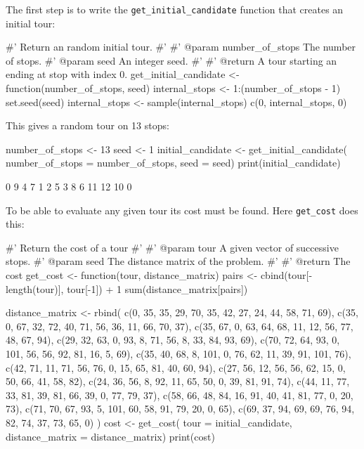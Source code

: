 The first step is to write the \texttt{get_initial_candidate}
function that creates an initial tour:

\begin{Rin}
#' Return an random initial tour.
#'
#' @param number_of_stops The number of stops.
#' @param seed An integer seed.
#'
#' @return A tour starting an ending at stop with index 0.
get_initial_candidate <- function(number_of_stops, seed){
    internal_stops <- 1:(number_of_stops - 1)
    set.seed(seed)
    internal_stops <- sample(internal_stops)
    c(0, internal_stops, 0)
}
\end{Rin}

This gives a random tour on 13 stops:

\begin{Rin}
number_of_stops <- 13
seed <- 1
initial_candidate <- get_initial_candidate(
    number_of_stops = number_of_stops,
    seed = seed)
print(initial_candidate)
\end{Rin}

\begin{Rout}
 [1]  0  9  4  7  1  2  5  3  8  6 11 12 10  0
\end{Rout}

To be able to evaluate any given tour its cost must be found. Here
\texttt{get_cost}  does this:

\begin{Rin}
#' Return the cost of a tour
#'
#' @param tour A given vector of successive stops.
#' @param seed The distance matrix of the problem.
#'
#' @return The cost
get_cost <- function(tour, distance_matrix){
    pairs <-  cbind(tour[-length(tour)], tour[-1]) + 1
    sum(distance_matrix[pairs])
}
\end{Rin}

\begin{Rin}
distance_matrix <- rbind(
        c(0, 35, 35, 29, 70, 35, 42, 27, 24, 44, 58, 71, 69),
        c(35, 0, 67, 32, 72, 40, 71, 56, 36, 11, 66, 70, 37),
        c(35, 67, 0, 63, 64, 68, 11, 12, 56, 77, 48, 67, 94),
        c(29, 32, 63, 0, 93, 8, 71, 56, 8, 33, 84, 93, 69),
        c(70, 72, 64, 93, 0, 101, 56, 56, 92, 81, 16, 5, 69),
        c(35, 40, 68, 8, 101, 0, 76, 62, 11, 39, 91, 101, 76),
        c(42, 71, 11, 71, 56, 76, 0, 15, 65, 81, 40, 60, 94),
        c(27, 56, 12, 56, 56, 62, 15, 0, 50, 66, 41, 58, 82),
        c(24, 36, 56, 8, 92, 11, 65, 50, 0, 39, 81, 91, 74),
        c(44, 11, 77, 33, 81, 39, 81, 66, 39, 0, 77, 79, 37),
        c(58, 66, 48, 84, 16, 91, 40, 41, 81, 77, 0, 20, 73),
        c(71, 70, 67, 93, 5, 101, 60, 58, 91, 79, 20, 0, 65),
        c(69, 37, 94, 69, 69, 76, 94, 82, 74, 37, 73, 65, 0)
)
cost <- get_cost(
    tour = initial_candidate,
    distance_matrix = distance_matrix)
print(cost)
\end{Rin}

